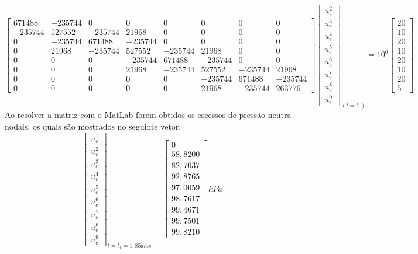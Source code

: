 \documentclass{article} %
\begin{document}
\begin{equation*}
\begin{bmatrix}
671488& -235744& 0& 0& 0& 0& 0& 0\\
-235744&527552&-235744&21968& 0& 0& 0& 0\\
0&-235744&671488&-235744& 0& 0& 0& 0\\
0&21968&-235744&527552&-235744&21968& 0& 0\\
0&0&0& -235744&671488&-235744& 0& 0\\
0&0&0&21968&-235744&527552&-235744&21968\\
0&0&0&0&0&-235744&671488&-235744\\
0&0&0&0&0&21968&-235744&263776
\end{bmatrix}\begin{bmatrix}
u_e^2\\
u_e^3\\
u_e^4\\
u_e^5\\
u_e^6\\
u_e^7\\
u_e^8\\
u_e^9
\end{bmatrix}_{(t=t_1)}
=10^6\begin{bmatrix}
20\\
10\\
20\\
10\\
20\\
10\\
20\\
5
\end{bmatrix}
\end{equation*}
\indent Ao resolver a matriz com o MatLab forem obtidos os escessos de pressão neutra nodais, os quais são mostrados no seguinte vetor.
\begin{equation}\label{t1}
\begin{bmatrix}
u_e^1\\
u_e^2\\
u_e^3\\
u_e^4\\
u_e^5\\
u_e^6\\
u_e^7\\
u_e^8\\
u_e^9
\end{bmatrix}_{t=t_1=1,85dias}=\begin{bmatrix}
0\\
58,8200\\
82,7037\\
92,8765\\
97,0059\\
98,7617\\
99,4671\\
99,7501\\
99,8210
\end{bmatrix}kPa
\end{equation}
\end{document}
